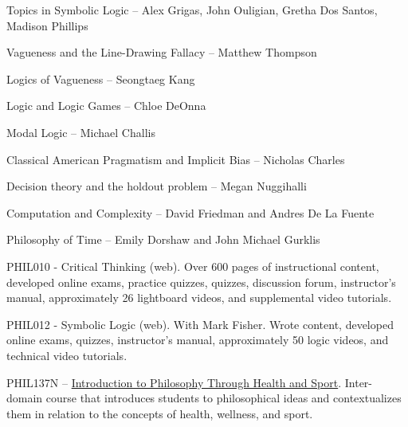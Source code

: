 \documentclass[p1noheader, 11pt]{../lightcv}
\begin{document}
\begin{rlist} 
\item Topics in Symbolic Logic -- Alex Grigas, John Ouligian, Gretha Dos Santos, Madison Phillips
\item Vagueness and the Line-Drawing Fallacy -- Matthew Thompson
\item Logics of Vagueness -- Seongtaeg Kang
\item Logic and Logic Games -- Chloe DeOnna
\item Modal Logic -- Michael Challis
\item Classical American Pragmatism and Implicit Bias -- Nicholas Charles
\item Decision theory and the holdout problem -- Megan Nuggihalli
\item Computation and Complexity -- David Friedman and Andres De La Fuente
\item Philosophy of Time -- Emily Dorshaw and John Michael Gurklis
\end{rlist}

\begin{rlist}    
    \item PHIL010 - Critical Thinking (web). Over 600 pages of instructional content, developed online exams, practice quizzes, quizzes, discussion forum, instructor’s manual, approximately
    26 lightboard videos, and supplemental video tutorials.
    \item PHIL012 - Symbolic Logic (web). With Mark Fisher. Wrote content, developed online exams, quizzes, instructor’s manual, approximately 50 logic videos, and technical video tutorials.
    \item PHIL137N – \href{https://bulletins.psu.edu/university-course-descriptions/undergraduate/phil/}{Introduction to Philosophy Through Health and Sport}. Inter-domain course that introduces students to philosophical ideas and contextualizes them in relation to the concepts of health, wellness, and sport.
\end{rlist}
\end{document}
